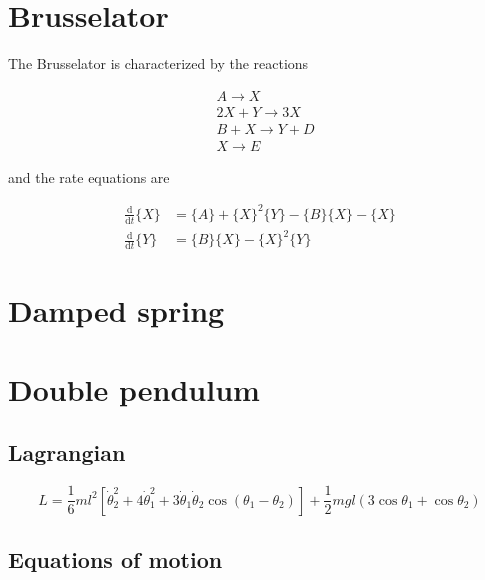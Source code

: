 \documentclass{report}
\begin{document}
\tableofcontents

\chapter{Brusselator}

The Brusselator is characterized by the reactions

\begin{align}
  &A \rightarrow X \\
  &2X + Y \rightarrow 3X \\
  &B + X \rightarrow Y + D \\
  &X \rightarrow E
\end{align}

and the rate equations are

\begin{align}
  \frac{\mathrm{d}}{\mathrm{d}t} \{X\} &= \{A\} + \{X\}^2\{Y\} - \{B\}\{X\} - \{X\} \\
  \frac{\mathrm{d}}{\mathrm{d}t} \{Y\} &= \{B\}\{X\} - \{X\}^2\{Y\}
\end{align}


\chapter{Damped spring}



\chapter{Double pendulum}

\section{Lagrangian}

\begin{equation}
  L = \frac{1}{6} ml^2 \left[ \dot{\theta}^2_2 + 4\dot{\theta}^2_1 + 3 \dot{\theta}_1 \dot{\theta}_2 \cos(\theta_1 - \theta_2) \right] + \frac{1}{2} mgl(3 \cos\theta_1 + \cos\theta_2)
\end{equation}

\section{Equations of motion}
\end{document}
